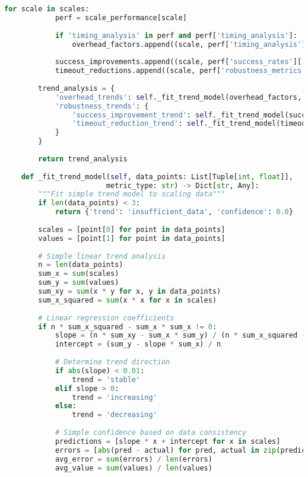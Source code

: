 \begin{lstlisting}[language=Python, caption=Scalability Analysis for Deployment Planning]
        for scale in scales:
            perf = scale_performance[scale]
            
            if 'timing_analysis' in perf and perf['timing_analysis']:
                overhead_factors.append((scale, perf['timing_analysis']['overhead_factor']))
            
            success_improvements.append((scale, perf['success_rates']['improvement']))
            timeout_reductions.append((scale, perf['robustness_metrics']['timeout_reduction']))
        
        trend_analysis = {
            'overhead_trends': self._fit_trend_model(overhead_factors, 'overhead'),
            'robustness_trends': {
                'success_improvement_trend': self._fit_trend_model(success_improvements, 'success'),
                'timeout_reduction_trend': self._fit_trend_model(timeout_reductions, 'timeout')
            }
        }
        
        return trend_analysis
    
    def _fit_trend_model(self, data_points: List[Tuple[int, float]], 
                        metric_type: str) -> Dict[str, Any]:
        """Fit simple trend model to scaling data"""
        if len(data_points) < 3:
            return {'trend': 'insufficient_data', 'confidence': 0.0}
        
        scales = [point[0] for point in data_points]
        values = [point[1] for point in data_points]
        
        # Simple linear trend analysis
        n = len(data_points)
        sum_x = sum(scales)
        sum_y = sum(values)
        sum_xy = sum(x * y for x, y in data_points)
        sum_x_squared = sum(x * x for x in scales)
        
        # Linear regression coefficients
        if n * sum_x_squared - sum_x * sum_x != 0:
            slope = (n * sum_xy - sum_x * sum_y) / (n * sum_x_squared - sum_x * sum_x)
            intercept = (sum_y - slope * sum_x) / n
            
            # Determine trend direction
            if abs(slope) < 0.01:
                trend = 'stable'
            elif slope > 0:
                trend = 'increasing'
            else:
                trend = 'decreasing'
            
            # Simple confidence based on data consistency
            predictions = [slope * x + intercept for x in scales]
            errors = [abs(pred - actual) for pred, actual in zip(predictions, values)]
            avg_error = sum(errors) / len(errors)
            avg_value = sum(values) / len(values)
            

\end{lstlisting}
